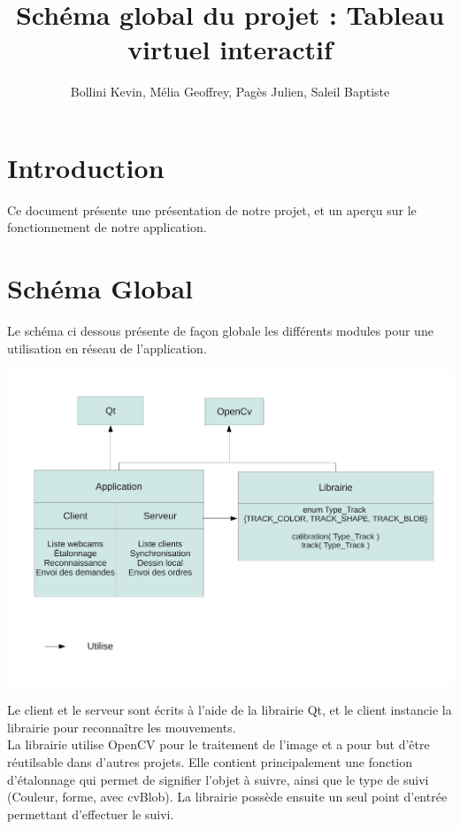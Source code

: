 \documentclass{article}
\title{Schéma global du projet : Tableau virtuel interactif}
\author{Bollini Kevin, Mélia Geoffrey, Pagès Julien, Saleil Baptiste}
\begin{document}
\maketitle

\section{Introduction}
Ce document présente une présentation de notre projet, et un aperçu sur le fonctionnement de notre application.

\section{Schéma Global}
Le schéma ci dessous présente de façon globale les différents modules pour une utilisation en réseau de l'application.
	\begin{center}
	\includegraphics[scale=0.5]{schema_global.pdf}
	\end{center}
Le client et le serveur sont écrits à l'aide de la librairie Qt, et le client instancie la librairie pour reconnaître les mouvements. \\
La librairie utilise OpenCV pour le traitement de l'image et a pour but d'être réutilsable dans d'autres projets. 
Elle contient principalement une fonction d'étalonnage qui permet de signifier l'objet à suivre, ainsi que le type de suivi (Couleur, forme, avec cvBlob). La librairie possède ensuite un seul point d'entrée permettant d'effectuer le suivi.
\end{document}
